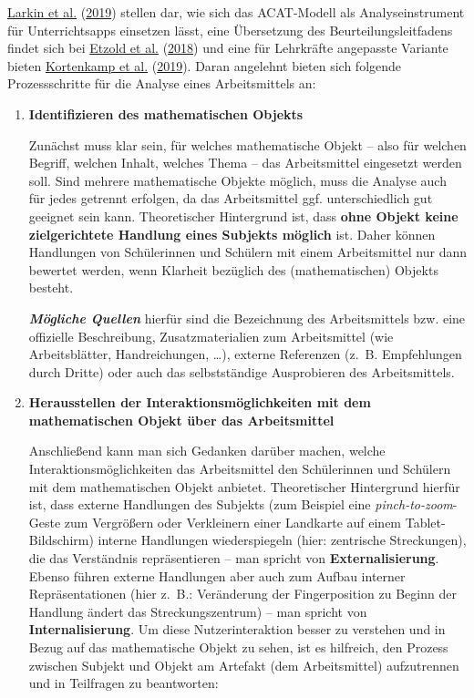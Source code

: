 \documentclass[
  ngerman,
]{scrbook}
\theoremstyle{definition}
\theoremstyle{definition}
\theoremstyle{definition}
\theoremstyle{definition}
\theoremstyle{remark}
\begin{document}
\protect\hyperlink{ref-Larkin2019}{Larkin et al.} (\protect\hyperlink{ref-Larkin2019}{2019}) stellen dar, wie sich das ACAT-Modell als Analyseinstrument für Unterrichtsapps einsetzen lässt, eine Übersetzung des Beurteilungsleitfadens findet sich bei \protect\hyperlink{ref-Etzold2018}{Etzold et al.} (\protect\hyperlink{ref-Etzold2018}{2018}) und eine für Lehrkräfte angepasste Variante bieten \protect\hyperlink{ref-Kortenkamp2019}{Kortenkamp et al.} (\protect\hyperlink{ref-Kortenkamp2019}{2019}). Daran angelehnt bieten sich folgende Prozessschritte für die Analyse eines Arbeitsmittels an:

\begin{enumerate}
\def\labelenumi{\arabic{enumi}.}
\item
  \textbf{Identifizieren des mathematischen Objekts}

  Zunächst muss klar sein, für welches mathematische Objekt -- also für welchen Begriff, welchen Inhalt, welches Thema -- das Arbeitsmittel eingesetzt werden soll. Sind mehrere mathematische Objekte möglich, muss die Analyse auch für jedes getrennt erfolgen, da das Arbeitsmittel ggf. unterschiedlich gut geeignet sein kann. Theoretischer Hintergrund ist, dass \textbf{ohne Objekt keine zielgerichtete Handlung eines Subjekts möglich} ist. Daher können Handlungen von Schülerinnen und Schülern mit einem Arbeitsmittel nur dann bewertet werden, wenn Klarheit bezüglich des (mathematischen) Objekts besteht.

  \textbf{\emph{Mögliche Quellen}} hierfür sind die Bezeichnung des Arbeitsmittels bzw. eine offizielle Beschreibung, Zusatzmaterialien zum Arbeitsmittel (wie Arbeitsblätter, Handreichungen, \ldots), externe Referenzen (z.~B. Empfehlungen durch Dritte) oder auch das selbstständige Ausprobieren des Arbeitsmittels.
\item
  \textbf{Herausstellen der Interaktionsmöglichkeiten mit dem mathematischen Objekt über das Arbeitsmittel}

  Anschließend kann man sich Gedanken darüber machen, welche Interaktionsmöglichkeiten das Arbeitsmittel den Schülerinnen und Schülern mit dem mathematischen Objekt anbietet. Theoretischer Hintergrund hierfür ist, dass externe Handlungen des Subjekts (zum Beispiel eine \emph{pinch-to-zoom}-Geste zum Vergrößern oder Verkleinern einer Landkarte auf einem Tablet-Bildschirm) interne Handlungen wiederspiegeln (hier: zentrische Streckungen), die das Verständnis repräsentieren -- man spricht von \textbf{Externalisierung}. Ebenso führen externe Handlungen aber auch zum Aufbau interner Repräsentationen (hier z.~B.: Veränderung der Fingerposition zu Beginn der Handlung ändert das Streckungszentrum) -- man spricht von \textbf{Internalisierung}. Um diese Nutzerinteraktion besser zu verstehen und in Bezug auf das mathematische Objekt zu sehen, ist es hilfreich, den Prozess zwischen Subjekt und Objekt am Artefakt (dem Arbeitsmittel) aufzutrennen und in Teilfragen zu beantworten:


\end{enumerate}
\end{document}
